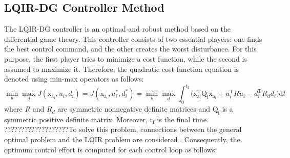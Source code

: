\documentclass[3p,times]{elsarticle}
\begin{document}
\subsection{LQIR-DG Controller Method}
The LQIR-DG controller is an optimal and robust method based on the differential game theory. This controller consists of two essential players: one finds the best control command, and the other creates the worst disturbance. 
For this purpose, the first player tries to minimize a cost function, while the second is assumed to maximize it. Therefore, the quadratic cost function equation is denoted using min-max operators as follows:
\begin{equation}
    \min_{u} \max_{d} J(\boldsymbol{\mathrm{x_{a_i}}}, {u_i}, {d_i}) = J(\boldsymbol{\mathrm{x_{a_i}}}, {u^*_i}, {d^*_i})=\min_{u} \max_{d}
     \int_{0}^{\mathrm{t_f}}\biggl (\boldsymbol{\mathrm{x^\mathrm{T}_{a_i}}}  \boldsymbol{\mathrm{Q_i}} \boldsymbol{\mathrm{x_{a_i}}}+
    {{u^\mathrm{T}_i}}  {{R}} {{u_i}}-
    {{d^\mathrm{T}_{i}}} {{ R_{d} d_{i}}}
    \biggl )\mathrm{d}t
\end{equation}
where ${{ R}}$ and ${{R_{d}}}$ are symmetric nonnegative definite matrices and $\boldsymbol{\mathrm{Q_i}} $ is a symmetric positive definite matrix.  Moreover, $\mathrm{t_f}$ is the final time. ???????????????????To solve this problem, connections between the general optimal problem and the LQIR problem are considered \cite{LQDG}. Consequently, the optimum control effort is computed for each control loop as follows:
\end{document}
